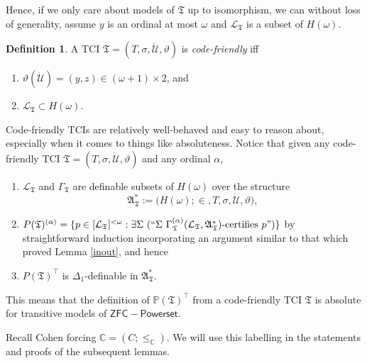 \documentclass[12pt, twoside]{memoir}
\numberwithin{equation}{section}
\theoremstyle{definition}
\newtheorem{defi}[thm]{Definition}
\theoremstyle{remark}
\theoremstyle{definition}
\theoremstyle{definition}
\theoremstyle{definition}
\theoremstyle{remark}
\begin{document}
Hence, if we only care about models of $\mathfrak{T}$ up to isomorphism, we can without loss of generality, assume $y$ is an ordinal at most $\omega$ and $\mathcal{L}_{\mathfrak{T}}$ is a subset of $H(\omega)$.

\begin{defi}
A TCI $\mathfrak{T} = (T, \sigma, \dot{\mathcal{U}}, \vartheta)$ is \emph{code-friendly} iff 
\begin{enumerate}[label=(\alph*)]
    \item $\vartheta(\dot{\mathcal{U}}) = (y, z) \in (\omega + 1) \times 2$, and 
    \item $\mathcal{L}_{\mathfrak{T}} \subset H(\omega)$.
\end{enumerate}
\end{defi}

Code-friendly TCIs are relatively well-behaved and easy to reason about, especially when it comes to things like absoluteness. Notice that given any code-friendly TCI $\mathfrak{T} = (T, \sigma, \dot{\mathcal{U}}, \vartheta)$ and any ordinal $\alpha$,
\begin{enumerate}[leftmargin=40pt, label=(CF\arabic*)]
    \item\label{cf1} $\mathcal{L}_{\mathfrak{T}}$ and $\Gamma_{\mathfrak{T}}$ are definable subsets of $H(\omega)$ over the structure $$\mathfrak{A}^*_{\mathfrak{T}} := \mathfrak(H(\omega); \in, T, \sigma, \dot{\mathcal{U}}, \vartheta),$$
    \item $P(\mathfrak{T})^{(\alpha)} = \{p \in [\mathcal{L}_{\mathfrak{T}}]^{< \omega} : \exists \Sigma \ (``\Sigma \ \Gamma_{\mathfrak{T}}^{(\alpha)} (\mathcal{L}_{\mathfrak{T}}, \mathfrak{A}^*_{\mathfrak{T}})\text{-certifies } p")\}$ by straightforward induction incorporating an argument similar to that which proved Lemma \ref{inout}, and hence
    \item $P(\mathfrak{T})^{\top}$ is $\Delta_1$-definable in $\mathfrak{A}^*_{\mathfrak{T}}$.
\end{enumerate}
This means that the definition of $\mathbb{P}(\mathfrak{T})^{\top}$ from a code-friendly TCI $\mathfrak{T}$ is absolute for transitive models of $\mathsf{ZFC - Powerset}$.

Recall Cohen forcing $\mathbb{C} = (C; \leq_{\mathbb{C}})$. We will use this labelling in the statements and proofs of the subsequent lemmas.
\end{document}
